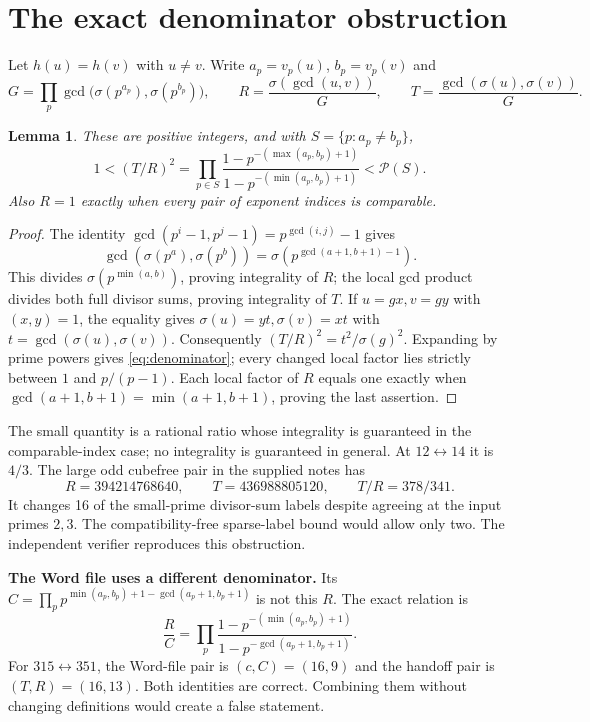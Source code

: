 \documentclass[11pt,a4paper]{article}
\newtheorem{lemma}[theorem]{Lemma}
\theoremstyle{remark}
\newcommand{\PP}{\mathcal P}
\begin{document}
\section{The exact denominator obstruction}
Let $h(u)=h(v)$ with $u\ne v$. Write $a_p=v_p(u)$, $b_p=v_p(v)$ and
\[
 G=\prod_p\gcd\bigl(\sigma(p^{a_p}),\sigma(p^{b_p})\bigr),\qquad
 R=\frac{\sigma(\gcd(u,v))}{G},\qquad
 T=\frac{\gcd(\sigma(u),\sigma(v))}{G}.
\]
\begin{lemma}\label{lem:denominator}
These are positive integers, and with $S=\{p:a_p\ne b_p\}$,
\begin{equation}\label{eq:denominator}
 1<(T/R)^2=
 \prod_{p\in S}\frac{1-p^{-(\max(a_p,b_p)+1)}}
                         {1-p^{-(\min(a_p,b_p)+1)}}<\PP(S).
\end{equation}
Also $R=1$ exactly when every pair of exponent indices is comparable.
\end{lemma}
\begin{proof}
The identity $\gcd(p^i-1,p^j-1)=p^{\gcd(i,j)}-1$ gives
\[
 \gcd(\sigma(p^a),\sigma(p^b))
 =\sigma(p^{\gcd(a+1,b+1)-1}).
\]
This divides $\sigma(p^{\min(a,b)})$, proving integrality of $R$;
the local gcd product divides both full divisor sums, proving integrality
of $T$. If $u=gx,v=gy$ with $(x,y)=1$, the equality gives
$\sigma(u)=yt,\sigma(v)=xt$ with $t=\gcd(\sigma(u),\sigma(v))$.
Consequently $(T/R)^2=t^2/\sigma(g)^2$. Expanding by prime powers gives
\eqref{eq:denominator}; every changed local factor lies strictly between
$1$ and $p/(p-1)$. Each local factor of $R$ equals one exactly when
$\gcd(a+1,b+1)=\min(a+1,b+1)$, proving the last assertion.
\end{proof}

The small quantity is a rational ratio whose integrality is guaranteed in the
comparable-index case; no integrality is guaranteed in general.
At $12\leftrightarrow14$ it is $4/3$.
The large odd cubefree pair in the supplied notes has
\[
 R=394214768640,\qquad T=436988805120,\qquad T/R=378/341.
\]
It changes 16 of the small-prime divisor-sum labels despite agreeing at the
input primes $2,3$. The compatibility-free sparse-label bound would allow
only two. The independent verifier reproduces this obstruction.

\textbf{The Word file uses a different denominator.}
Its $C=\prod_p p^{\min(a_p,b_p)+1-\gcd(a_p+1,b_p+1)}$ is not this $R$.
The exact relation is
\[
 \frac RC=\prod_p
 \frac{1-p^{-(\min(a_p,b_p)+1)}}{1-p^{-\gcd(a_p+1,b_p+1)}}.
\]
For $315\leftrightarrow351$, the Word-file pair is $(c,C)=(16,9)$ and
the handoff pair is $(T,R)=(16,13)$. Both identities are correct. Combining
them without changing definitions would create a false statement.
\end{document}
